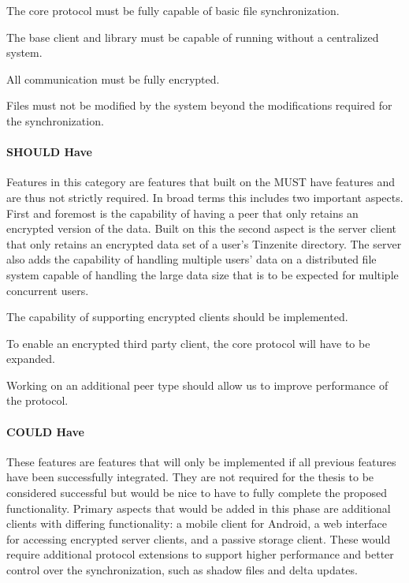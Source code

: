 \begin{description}[leftmargin=16em,style=nextline,noitemsep,nolistsep]
\item[File Synchronization Protocol]
    The core protocol must be fully capable of basic file synchronization.
\item[Peer to Peer Architecture]
    The base client and library must be capable of running without a centralized system.
\item[Secure Transport]
    All communication must be fully encrypted.
\item[Object Atomicity]
    Files must not be modified by the system beyond the modifications required for the synchronization.
\end{description}


\paragraph{SHOULD Have}
\label{par:SHOULD Have}
Features in this category are features that built on the MUST have features and are thus not strictly required.
In broad terms this includes two important aspects.
First and foremost is the capability of having a peer that only retains an encrypted version of the data.
Built on this the second aspect is the server client that only retains an encrypted data set of a user's Tinzenite directory.
The server also adds the capability of handling multiple users' data on a distributed file system capable of handling the large data size that is to be expected for multiple concurrent users.

\begin{description}[leftmargin=10em,style=nextline,noitemsep,nolistsep]
\item[Third Party Client]
    The capability of supporting encrypted clients should be implemented.
\item[Protocol Extension]
    To enable an encrypted third party client, the core protocol will have to be expanded.
\item[Performance]
    Working on an additional peer type should allow us to improve performance of the protocol.
\end{description}

\paragraph{COULD Have}
\label{par:COULD Have}
These features are features that will only be implemented if all previous features have been successfully integrated.
They are not required for the thesis to be considered successful but would be nice to have to fully complete the proposed functionality.
Primary aspects that would be added in this phase are additional clients with differing functionality: a mobile client for Android, a web interface for accessing encrypted server clients, and a passive storage client.
These would require additional protocol extensions to support higher performance and better control over the synchronization, such as shadow files and delta updates.

